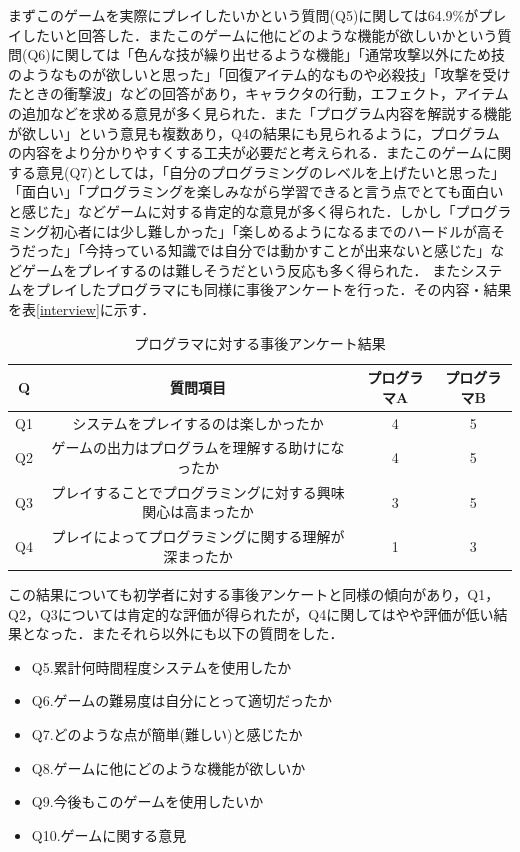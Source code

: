 まずこのゲームを実際にプレイしたいかという質問(Q5)に関しては64.9\%がプレイしたいと回答した．またこのゲームに他にどのような機能が欲しいかという質問(Q6)に関しては「色んな技が繰り出せるような機能」「通常攻撃以外にため技のようなものが欲しいと思った」「回復アイテム的なものや必殺技」「攻撃を受けたときの衝撃波」などの回答があり，キャラクタの行動，エフェクト，アイテムの追加などを求める意見が多く見られた．また「プログラム内容を解説する機能が欲しい」という意見も複数あり，Q4の結果にも見られるように，プログラムの内容をより分かりやすくする工夫が必要だと考えられる．またこのゲームに関する意見(Q7)としては，「自分のプログラミングのレベルを上げたいと思った」「面白い」「プログラミングを楽しみながら学習できると言う点でとても面白いと感じた」などゲームに対する肯定的な意見が多く得られた．しかし「プログラミング初心者には少し難しかった」「楽しめるようになるまでのハードルが高そうだった」「今持っている知識では自分では動かすことが出来ないと感じた」などゲームをプレイするのは難しそうだという反応も多く得られた．
またシステムをプレイしたプログラマにも同様に事後アンケートを行った．その内容・結果を表\ref{interview}に示す．

\begin{table}[!ht]
  \centering
  \caption{プログラマに対する事後アンケート結果}
  \label{programmer_interview}
    \begin{tabular}{|c|c|c|c|} \hline
      Q & 質問項目 & プログラマA & プログラマB \\ \hline
      Q1 & システムをプレイするのは楽しかったか & 4 & 5 \\ \hline
      Q2 & ゲームの出力はプログラムを理解する助けになったか & 4 & 5\\ \hline
      Q3 & プレイすることでプログラミングに対する興味関心は高まったか & 3 & 5\\ \hline
      Q4 & プレイによってプログラミングに関する理解が深まったか & 1 & 3\\ \hline
    \end{tabular}
\end{table}
この結果についても初学者に対する事後アンケートと同様の傾向があり，Q1，Q2，Q3については肯定的な評価が得られたが，Q4に関してはやや評価が低い結果となった．またそれら以外にも以下の質問をした．

\begin{itemize}
  \item Q5.累計何時間程度システムを使用したか
  \item Q6.ゲームの難易度は自分にとって適切だったか
  \item Q7.どのような点が簡単(難しい)と感じたか
  \item Q8.ゲームに他にどのような機能が欲しいか
  \item Q9.今後もこのゲームを使用したいか
  \item Q10.ゲームに関する意見
\end{itemize}

